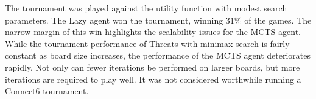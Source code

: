 The tournament was played against the  utility function with modest search parameters. The {Lazy} agent won the tournament, winning $31\%$ of the games. The narrow margin of this win highlights the scalability issues for the {MCTS} agent. While the tournament performance of {Threats} with minimax search is fairly constant as board size increases, the performance of the {MCTS} agent deteriorates rapidly. Not only can fewer iterations be performed on larger boards, but more iterations are required to play well. It was not considered worthwhile running a {Connect6} tournament.











